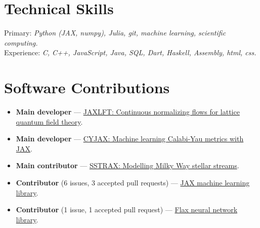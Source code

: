 \documentclass[11pt]{article}
\begin{document}
\section*{Technical Skills}
Primary: \textit{Python (JAX, numpy), Julia, git, machine learning, scientific computing.} \\
Experience: \textit{C, C++, JavaScript, Java, SQL, Dart, Haskell, Assembly, html, css.}

\section*{Software Contributions}
\begin{itemize}[left=0pt]
    \item \textbf{Main developer} — \href{https://github.com/mathisgerdes/continuous-flow-lft}{JAXLFT: Continuous normalizing flows for lattice quantum field theory}.
    \item \textbf{Main developer} — \href{https://github.com/ml4physics/cyjax}{CYJAX: Machine learning Calabi-Yau metrics with JAX}.
    \item \textbf{Main contributor} — \href{https://github.com/undark-lab/sstrax}{SSTRAX: Modelling Milky Way stellar streams}.
    \item \textbf{Contributor} (6 issues, 3 accepted pull requests) — \href{https://github.com/google/jax/issues?q=author:mathisgerdes}{JAX machine learning library}.
    \item \textbf{Contributor} (1 issue, 1 accepted pull request) — \href{https://github.com/google/flax/issues?q=author:mathisgerdes}{Flax neural network library}.
\end{itemize}


\end{document}
